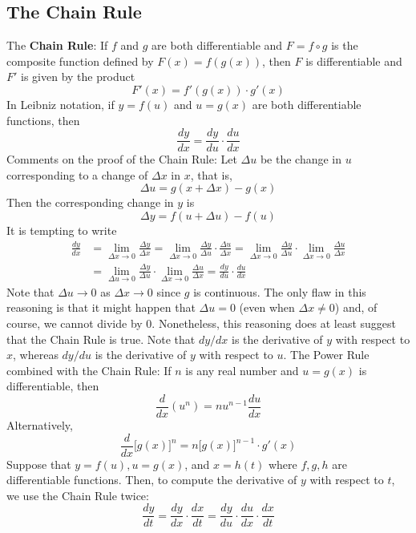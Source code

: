 \subsection{The Chain Rule}

The \textbf{Chain Rule}: If \(f\) and \(g\) are both differentiable and
\(F=f\circ g\) is the composite function defined by \(F(x)=f(g(x))\), then
\(F\) is differentiable and \(F'\) is given by the product
\[F'(x)=f'(g(x))\cdot g'(x)\]
In Leibniz notation, if \(y=f(u)\) and \(u=g(x)\) are both differentiable
functions, then
\[\frac{dy}{dx}=\frac{dy}{du}\cdot\frac{du}{dx}\]
Comments on the proof of the Chain Rule: Let \(\Delta u\) be the change in
\(u\) corresponding to a change of \(\Delta x\) in \(x\), that is,
\[\Delta u=g(x+\Delta x)-g(x)\]
Then the corresponding change in \(y\) is
\[\Delta y=f(u+\Delta u)-f(u)\]
It is tempting to write
\begin{align*}
    \frac{dy}{dx} &= \lim_{\Delta x\to 0}\frac{\Delta y}{\Delta x}
    =\lim_{\Delta x\to 0}
    \frac{\Delta y}{\Delta u}\cdot\frac{\Delta u}{\Delta x}
    =\lim_{\Delta x\to 0}\frac{\Delta y}{\Delta u}
    \cdot\lim_{\Delta x\to 0}\frac{\Delta u}{\Delta x} \\
    &= \lim_{\Delta u\to 0}\frac{\Delta y}{\Delta u}
    \cdot\lim_{\Delta x\to 0}\frac{\Delta u}{\Delta x}
    =\frac{dy}{du}\cdot\frac{du}{dx}
\end{align*}
Note that \(\Delta u\to 0\) as \(\Delta x\to 0\) since \(g\) is continuous.
The only flaw in this reasoning is that it might happen that \(\Delta u=0\)
(even when \(\Delta x\neq 0\)) and, of course, we cannot divide by 0.
Nonetheless, this reasoning does at least suggest that the Chain Rule is true.
Note that \(dy/dx\) is the derivative of \(y\) with respect to \(x\), whereas
\(dy/du\) is the derivative of \(y\) with respect to \(u\).
The Power Rule combined with the Chain Rule: If \(n\) is any real number and
\(u=g(x)\) is differentiable, then
\[\frac{d}{dx}(u^n)=nu^{n-1}\frac{du}{dx}\]
Alternatively,
\[\frac{d}{dx}\big[g(x)\big]^n=n\big[g(x)\big]^{n-1}\cdot g'(x)\]
Suppose that \(y=f(u),u=g(x)\), and \(x=h(t)\) where \(f,g,h\) are
differentiable functions.
Then, to compute the derivative of \(y\) with respect to \(t\), we use the
Chain Rule twice:
\[\frac{dy}{dt}=\frac{dy}{dx}\cdot\frac{dx}{dt}
=\frac{dy}{du}\cdot\frac{du}{dx}\cdot\frac{dx}{dt}\]

